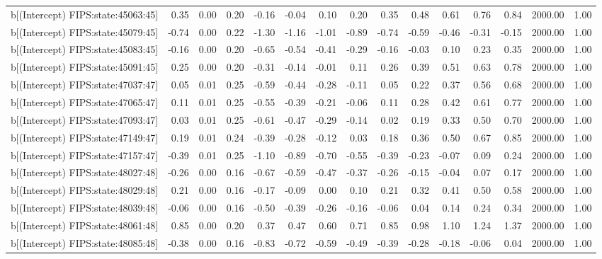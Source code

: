 \begin{table}[ht]
\begin{tabular}{rrrrrrrrrrrrrrr}
  b[(Intercept) FIPS:state:45063:45] & 0.35 & 0.00 & 0.20 & -0.16 & -0.04 & 0.10 & 0.20 & 0.35 & 0.48 & 0.61 & 0.76 & 0.84 & 2000.00 & 1.00 \\ 
  b[(Intercept) FIPS:state:45079:45] & -0.74 & 0.00 & 0.22 & -1.30 & -1.16 & -1.01 & -0.89 & -0.74 & -0.59 & -0.46 & -0.31 & -0.15 & 2000.00 & 1.00 \\ 
  b[(Intercept) FIPS:state:45083:45] & -0.16 & 0.00 & 0.20 & -0.65 & -0.54 & -0.41 & -0.29 & -0.16 & -0.03 & 0.10 & 0.23 & 0.35 & 2000.00 & 1.00 \\ 
  b[(Intercept) FIPS:state:45091:45] & 0.25 & 0.00 & 0.20 & -0.31 & -0.14 & -0.01 & 0.11 & 0.26 & 0.39 & 0.51 & 0.63 & 0.78 & 2000.00 & 1.00 \\ 
  b[(Intercept) FIPS:state:47037:47] & 0.05 & 0.01 & 0.25 & -0.59 & -0.44 & -0.28 & -0.11 & 0.05 & 0.22 & 0.37 & 0.56 & 0.68 & 2000.00 & 1.00 \\ 
  b[(Intercept) FIPS:state:47065:47] & 0.11 & 0.01 & 0.25 & -0.55 & -0.39 & -0.21 & -0.06 & 0.11 & 0.28 & 0.42 & 0.61 & 0.77 & 2000.00 & 1.00 \\ 
  b[(Intercept) FIPS:state:47093:47] & 0.03 & 0.01 & 0.25 & -0.61 & -0.47 & -0.29 & -0.14 & 0.02 & 0.19 & 0.33 & 0.50 & 0.70 & 2000.00 & 1.00 \\ 
  b[(Intercept) FIPS:state:47149:47] & 0.19 & 0.01 & 0.24 & -0.39 & -0.28 & -0.12 & 0.03 & 0.18 & 0.36 & 0.50 & 0.67 & 0.85 & 2000.00 & 1.00 \\ 
  b[(Intercept) FIPS:state:47157:47] & -0.39 & 0.01 & 0.25 & -1.10 & -0.89 & -0.70 & -0.55 & -0.39 & -0.23 & -0.07 & 0.09 & 0.24 & 2000.00 & 1.00 \\ 
  b[(Intercept) FIPS:state:48027:48] & -0.26 & 0.00 & 0.16 & -0.67 & -0.59 & -0.47 & -0.37 & -0.26 & -0.15 & -0.04 & 0.07 & 0.17 & 2000.00 & 1.00 \\ 
  b[(Intercept) FIPS:state:48029:48] & 0.21 & 0.00 & 0.16 & -0.17 & -0.09 & 0.00 & 0.10 & 0.21 & 0.32 & 0.41 & 0.50 & 0.58 & 2000.00 & 1.00 \\ 
  b[(Intercept) FIPS:state:48039:48] & -0.06 & 0.00 & 0.16 & -0.50 & -0.39 & -0.26 & -0.16 & -0.06 & 0.04 & 0.14 & 0.24 & 0.34 & 2000.00 & 1.00 \\ 
  b[(Intercept) FIPS:state:48061:48] & 0.85 & 0.00 & 0.20 & 0.37 & 0.47 & 0.60 & 0.71 & 0.85 & 0.98 & 1.10 & 1.24 & 1.37 & 2000.00 & 1.00 \\ 
  b[(Intercept) FIPS:state:48085:48] & -0.38 & 0.00 & 0.16 & -0.83 & -0.72 & -0.59 & -0.49 & -0.39 & -0.28 & -0.18 & -0.06 & 0.04 & 2000.00 & 1.00 \\ 

\end{tabular}
\end{table}
